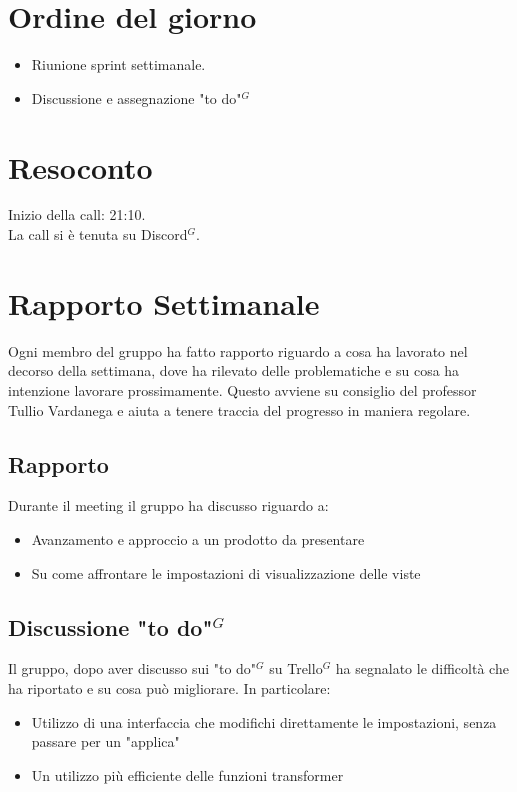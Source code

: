 \section{Ordine del giorno}

\begin{itemize}
	\item Riunione sprint settimanale.
    \item Discussione e assegnazione "to do"$^{G}$ 
\end{itemize}

\section{Resoconto}

\noindent
Inizio della call: 21:10. \\
\noindent La call si è tenuta su Discord$^{G}$.
\section{Rapporto Settimanale}
Ogni membro del gruppo ha fatto rapporto riguardo a cosa ha lavorato nel decorso della settimana, dove ha rilevato delle problematiche e su cosa ha intenzione lavorare prossimamente.
Questo avviene su consiglio del professor Tullio Vardanega e aiuta a tenere traccia del progresso in maniera regolare.

\subsection{Rapporto}
Durante il meeting il gruppo ha discusso riguardo a:
\begin{itemize}
	\item Avanzamento e approccio a un prodotto da presentare
    \item Su come affrontare le impostazioni di visualizzazione delle viste
\end{itemize}

\subsection{Discussione "to do"$^{G}$}
Il gruppo, dopo aver discusso sui "to do"$^{G}$ su Trello$^{G}$ ha segnalato le difficoltà che ha riportato e su cosa può migliorare. In particolare:
\begin{itemize}
	\item Utilizzo di una interfaccia che modifichi direttamente le impostazioni, senza passare per un "applica"
	\item Un utilizzo più efficiente delle funzioni transformer
\end{itemize}

